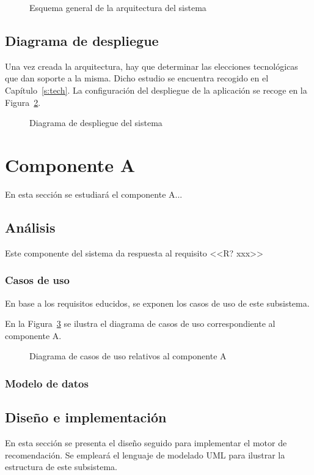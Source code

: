 \begin{figure}[h!]
\centering
\caption{Esquema general de la arquitectura del sistema}
\label{f:dev:arch}
\end{figure}


\subsection{Diagrama de despliegue}
Una vez creada la arquitectura, hay que determinar las elecciones tecnológicas que dan soporte a la misma. Dicho estudio se encuentra recogido en el Capítulo~\ref{s:tech}. La configuración del despliegue de la aplicación se recoge en la Figura~\ref{f:dev:arch-deploy}.

\begin{figure}[h!]
\centering
\caption{Diagrama de despliegue del sistema}
\label{f:dev:arch-deploy}
\end{figure}


\section{Componente A}
En esta sección se estudiará el componente A...

\subsection{Análisis}
Este componente del sistema da respuesta al requisito <<R? xxx>> 

\subsubsection{Casos de uso}
En base a los requisitos educidos, se exponen los casos de uso de este subsistema.

En la Figura~\ref{f:dev:use-cases-recsys} se ilustra el diagrama de casos de uso correspondiente al componente A.

\begin{figure}[h!]
\centering
\caption{Diagrama de casos de uso relativos al componente A}
\label{f:dev:use-cases-recsys}
\end{figure}

\subsubsection{Modelo de datos}


\subsection{Diseño e implementación}
En esta sección se presenta el diseño seguido para implementar el motor de recomendación. Se empleará el lenguaje de modelado UML para ilustrar la estructura de este subsistema.
